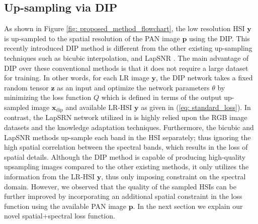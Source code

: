 \documentclass[journal]{IEEEtran}
\begin{document}
\subsection{Up-sampling via DIP}
    \label{DIP}
    \par As shown in Figure \ref{fig: proposed_method_flowchart}, the low resolution HSI $\mathbf{y}$ is up-sampled to the spatial resolution of the PAN image $\mathbf{p}$ using the DIP. This recently introduced DIP method is different from the other existing up-sampling techniques such as bicubic interpolation, and LapSNR \cite{lap_snr}. The main advantage of DIP over these conventional methods is that it does not require a large dataset for training. In other words, for each LR image $\mathbf{y}$, the DIP network takes a fixed random tensor $\mathbf{z}$ as an input and optimize the network parameters $\theta$ by minimizing the loss function $Q$ which is defined in terms of the output up-sampled image $\mathbf{x}_{\text{dip}}$ and available LR-HSI $\mathbf{y}$ as given in (\ref{eq: standard_loss}). In contrast, the LapSRN network utilized in \cite{DDLPS} is highly relied upon the RGB image datasets and the knowledge adaptation techniques. Furthermore, the bicubic and LapSNR methods up-sample each band in the HSI separately; thus ignoring the high spatial correlation between the spectral bands, which results in the loss of spatial details. Although the DIP method is capable of producing high-quality upsampling images compared to the other existing methods, it only utilizes the information from the LR-HSI $\mathbf{y}$, thus only imposing constraint on the spectral domain. However, we observed that the quality of the sampled HSIs can be further improved by incorporating an additional spatial constraint in the loss function using the available PAN image $ \mathbf {p} $. In the next section we explain our novel spatial+spectral loss function. 
    
\end{document}
